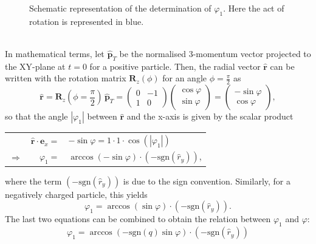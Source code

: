 \begin{figure}[h]
	\caption{Schematic representation of the determination of $\varphi_1$. Here the act of rotation is represented in blue.}
\end{figure}\\
In mathematical terms, let $\hat{\boldsymbol{p}}_T$ be the normalised 3-momentum vector projected to the XY-plane at $t=0$ for a positive particle. Then, the radial vector $\hat{\boldsymbol{r}}$ can be written with the rotation matrix $\textbf{R}_z (\phi)$ for an angle $\phi = \frac{\pi}{2}$ as
\begin{equation}
	\hat{\boldsymbol{r}} = \boldsymbol{R}_z\left(\phi = \frac{\pi}{2}\right)\,\hat{\boldsymbol{p}}_T = \begin{pmatrix}
	0 & -1 \\ 
	1 & 0 
	\end{pmatrix} \begin{pmatrix}
	\cos\varphi\\ 
	\sin\varphi
	\end{pmatrix} = \begin{pmatrix}
	-\sin\varphi\\ 
	\cos\varphi
	\end{pmatrix},
\end{equation}
so that the angle $|\varphi_1|$ between $\hat{\boldsymbol{r}}$ and the x-axis is given by the scalar product
\begin{center}
	\begin{tabular}{crl}
		&$\hat{\boldsymbol{r}} \cdot \boldsymbol{e}_x=$&$ -\sin\varphi= 1 \cdot 1\cdot\cos(|\varphi_1|)$\\
		\rule{0pt}{3ex}$\Rightarrow$&$\varphi_1 =$&$ \arccos(-\sin\varphi)\cdot(-\mathrm{sgn}(\hat{r}_y))$, \\ 
	\end{tabular} 
\end{center}
where the term $(-\mathrm{sgn}(\hat{r}_y))$ is due to the sign convention. Similarly, for a negatively charged particle, this yields
\begin{equation}
	\varphi_1 =\arccos(\sin\varphi)\cdot (-\mathrm{sgn}(\hat{r}_y)).
\end{equation}
The last two equations can be combined to obtain the relation between $\varphi_1$ and $\varphi$:
\begin{equation}
	\varphi_1 =\arccos(-\mathrm{sgn}(q)\sin\varphi)\cdot (-\mathrm{sgn}(\hat{r}_y))
\end{equation}
